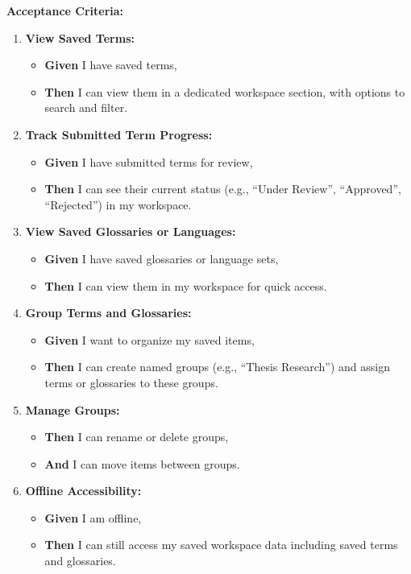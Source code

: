 \vspace{1em}
\textbf{Acceptance Criteria:}
\begin{enumerate}
    \item \textbf{View Saved Terms:}
    \begin{itemize}
        \item \textbf{Given} I have saved terms,
        \item \textbf{Then} I can view them in a dedicated workspace section, with options to search and filter.
    \end{itemize}

    \item \textbf{Track Submitted Term Progress:}
    \begin{itemize}
        \item \textbf{Given} I have submitted terms for review,
        \item \textbf{Then} I can see their current status (e.g., ``Under Review'', ``Approved'', ``Rejected'') in my workspace.
    \end{itemize}

    \item \textbf{View Saved Glossaries or Languages:}
    \begin{itemize}
        \item \textbf{Given} I have saved glossaries or language sets,
        \item \textbf{Then} I can view them in my workspace for quick access.
    \end{itemize}

    \item \textbf{Group Terms and Glossaries:}
    \begin{itemize}
        \item \textbf{Given} I want to organize my saved items,
        \item \textbf{Then} I can create named groups (e.g., ``Thesis Research'') and assign terms or glossaries to these groups.
    \end{itemize}

    \item \textbf{Manage Groups:}
    \begin{itemize}
        \item \textbf{Then} I can rename or delete groups,
        \item \textbf{And} I can move items between groups.
    \end{itemize}

    \item \textbf{Offline Accessibility:}
    \begin{itemize}
        \item \textbf{Given} I am offline,
        \item \textbf{Then} I can still access my saved workspace data including saved terms and glossaries.
    \end{itemize}


\end{enumerate}
